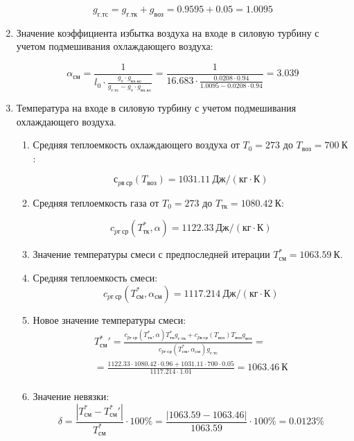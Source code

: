 \documentclass[a4paper,10pt]{article}
\begin{document}
\begin{enumerate}
	\[ g_{г.тс} = g_{г.тк} + g_{воз} = 0.9595 + 0.05 = 1.0095 \]

	\item Значение коэффициента избытка воздуха на входе в силовую турбину с учетом подмешивания охлаждающего воздуха:

	\[
		\alpha_{см} = \frac{1}{
				l_0 \cdot \frac{g_т \cdot g_{вх.кс}}{g_{г.тс} - g_т \cdot g_{вх.кс}}
		} =
		\frac{1}{
				16.683 \cdot \frac{
					0.0208 \cdot 0.94
					}{
					1.0095 -
					0.0208 \cdot 0.94
			}
		} =
		3.039
	\]

	\item Температура на входе в силовую турбину с учетом подмешивания охлаждающего воздуха.
	\begin{enumerate}

		\item Средняя теплоемкость охлаждающего воздуха от $T_0 = 273$ до $T_{воз} = 700\ К $:

		\[
			с_{pв\ ср} (T_{воз}) = 1031.11\ Дж/(кг \cdot К)
		\]

		\item Средняя теплоемкость газа от $T_0 = 273$ до $T_{тк} = 1080.42\ К$:

		\[
			c_{pг\ ср} (T_{тк}^*, \alpha) = 1122.33\ Дж/(кг \cdot К)
		\]

		\item Значение температуры смеси с предпоследней итерации $T_{см}^* = 1063.59\ К$.

		\item Средняя теплоемкость смеси:
		\[
			c_{pг\ ср} (T_{см}^*, \alpha_{см}) = 1117.214\ Дж/(кг \cdot К)
		\]

		\item Новое значение температуры смеси:
		\begin{gather*}
			T_{см}^*\prime = \frac{
                        c_{pг\ ср} (T_{тк}^*, \alpha) T_{тк}^* g_{г.тк} + c_{pв\ ср} (T_{воз}) T_{воз} g_{воз}
                    }{
                        c_{pг\ ср} (T_{см}^{*}, \alpha_{см}) g_{г.тс}
                    } =\\
			= \frac{
                        1122.33 \cdot 1080.42 \cdot
						0.96 +
						1031.11 \cdot 700 \cdot
						0.05
                    }{
                        1117.214 \cdot  1.01
                    } =
			1063.46\ К\\
		\end{gather*}

		\item Значение невязки:
		\[
			\delta =\frac{ \left| T_{см}^{*} - T_{см}^*\prime \right| }{T_{см}^{*}} \cdot 100 \% =
				\frac{
                        \left| 1063.59 - 1063.46 \right|
                    }{
                        1063.59
                    } \cdot 100 \% =
			0.0123 \%
		\]



\end{enumerate}
\end{enumerate}
\end{document}
